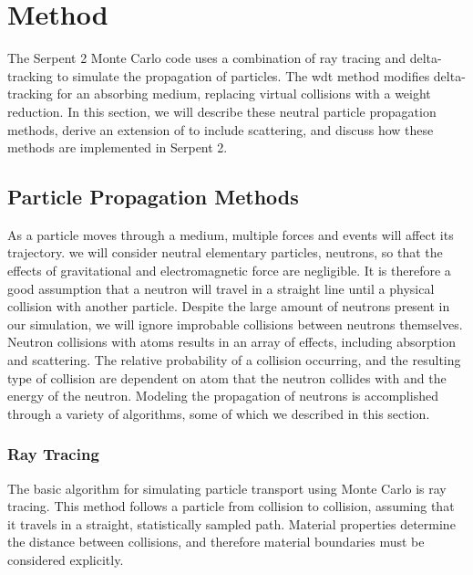 \chapter{Method}
\label{chap:method}

The Serpent 2 Monte Carlo code uses a combination of ray tracing and
delta-tracking to simulate the propagation of particles. The \gls{wdt}
method modifies delta-tracking for an absorbing medium, replacing virtual
collisions with a weight reduction. In this section, we will describe
these neutral particle propagation methods, derive an extension of \wdt{} to
include scattering, and discuss how these methods are implemented in
Serpent 2.

\section{Particle Propagation Methods}
\label{sec:propagation}

As a particle moves through a medium, multiple forces and events will
affect its trajectory. we will consider neutral elementary particles,
neutrons, so that the effects of gravitational and electromagnetic
force are negligible. It is therefore a good assumption that a neutron
will travel in a straight line until a physical collision with another
particle. Despite the large amount of neutrons present in our
simulation, we will ignore improbable collisions between neutrons
themselves. Neutron collisions with atoms results in an array of
effects, including absorption and scattering. The relative probability
of a collision occurring, and the resulting type of collision are
dependent on atom that the neutron collides with and the energy of the
neutron. Modeling the propagation of neutrons is accomplished through
a variety of algorithms, some of which we described in this section.

\subsection{Ray Tracing}
\label{sec:ray_tracing}

The basic algorithm for simulating particle transport using Monte Carlo is
ray tracing. This method follows a particle from collision to
collision, assuming that it travels in a straight, statistically
sampled path. Material properties determine the distance between
collisions, and therefore material boundaries must be considered explicitly.

